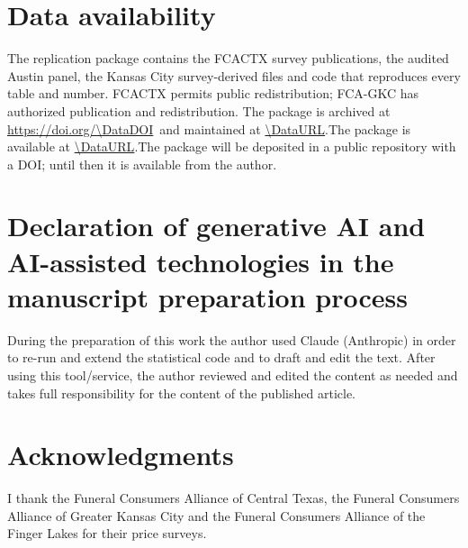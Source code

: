 \documentclass[preprint,12pt,authoryear]{elsarticle}
\begin{document}



\section*{Data availability}
The replication package contains the FCACTX survey publications, the audited Austin panel, the Kansas City survey-derived files and code that reproduces every table and number. FCACTX permits public redistribution; FCA-GKC has authorized publication and redistribution. \ifdefined\DataDOI The package is archived at \url{https://doi.org/\DataDOI}\ifdefined\DataURL\ and maintained at \url{\DataURL}\fi.\else\ifdefined\DataURL The package is available at \url{\DataURL}.\else The package will be deposited in a public repository with a DOI; until then it is available from the author.\fi\fi

\section*{Declaration of generative AI and AI-assisted technologies in the manuscript preparation process}
During the preparation of this work the author used Claude (Anthropic) in order to re-run and extend the statistical code and to draft and edit the text. After using this tool/service, the author reviewed and edited the content as needed and takes full responsibility for the content of the published article.

\section*{Acknowledgments}
I thank the Funeral Consumers Alliance of Central Texas, the Funeral Consumers Alliance of Greater Kansas City and the Funeral Consumers Alliance of the Finger Lakes for their price surveys.




\ifdefined\SSRN
\clearpage

\fi
\end{document}
